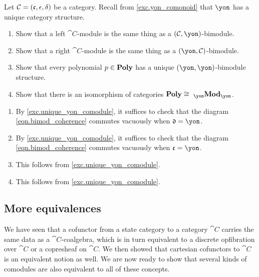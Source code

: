 \documentclass[Book-Poly]{subfiles}
\begin{document}
\begin{exercise}
Let $\mathcal{C}=(\mathfrak{c},\epsilon,\delta)$ be a category. Recall from \cref{exc.yon_comonoid} that $\yon$ has a unique category structure.
\begin{enumerate}
	\item Show that a left $\cat{C}$-module is the same thing as a $(\cat{C},\yon)$-bimodule.
	\item Show that a right $\cat{C}$-module is the same thing as a $(\yon,\cat{C})$-bimodule.
	\item Show that every polynomial $p\in\mathbf{Poly}$ has a unique $(\yon,\yon)$-bimodule structure.
	\item Show that there is an isomorphism of categories $\poly\cong\bimod{\yon}{\yon}$.
\qedhere
\end{enumerate}
\begin{solution}
\begin{enumerate}
    \item By \cref{exc.unique_yon_comodule}, it suffices to check that the diagram \eqref{eqn.bimod_coherence} commutes vacuously when $\car{d}=\yon$.
    \item By \cref{exc.unique_yon_comodule}, it suffices to check that the diagram \eqref{eqn.bimod_coherence} commutes vacuously when $\car{c}=\yon$.
    \item This follows from \cref{exc.unique_yon_comodule}.
    \item This follows from \cref{exc.unique_yon_comodule}.
\end{enumerate}
\end{solution}
\end{exercise}

\subsection{More equivalences}

We have seen that a cofunctor from a state category to a category $\cat{C}$ carries the same data as a $\cat{C}$-coalgebra, which is in turn equivalent to a discrete opfibration over $\cat{C}$ or a copresheaf on $\cat{C}$.
We then showed that cartesian cofunctors to $\cat{C}$ is an equivalent notion as well. %
We are now ready to show that several kinds of comodules are also equivalent to all of these concepts.
\end{document}
